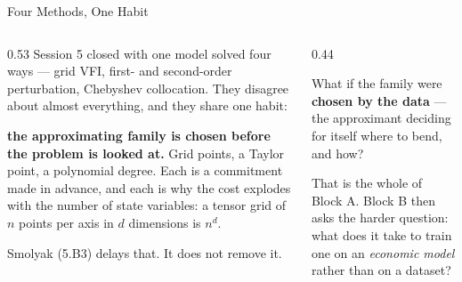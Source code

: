 \begin{frame}{Four Methods, One Habit}
\begin{columns}[T]
\begin{column}{0.53\textwidth}
\small
Session 5 closed with one model solved four ways --- grid VFI, first- and second-order perturbation, Chebyshev collocation. They disagree about almost everything, and they share one habit:
\medskip

\textbf{the approximating family is chosen before the problem is looked at.} Grid points, a Taylor point, a polynomial degree. Each is a commitment made in advance, and each is why the cost explodes with the number of state variables: a tensor grid of $n$ points per axis in $d$ dimensions is $n^{d}$.
\medskip

Smolyak (5.B3) delays that. It does not remove it.
\end{column}
\begin{column}{0.44\textwidth}
\begin{conceptbox}[title=\textbf{The question for this session}]\small
What if the family were \textbf{chosen by the data} --- the approximant deciding for itself where to bend, and how?
\end{conceptbox}
\medskip
\begin{takeawaybox}\footnotesize
That is the whole of Block A. Block B then asks the harder question: what does it take to train one on an \emph{economic model} rather than on a dataset?
\end{takeawaybox}
\end{column}
\end{columns}
\vspace{1mm}
\end{frame}

